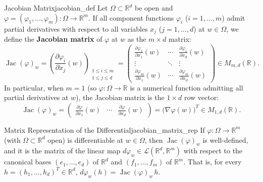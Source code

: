 \documentclass[11pt, a4paper]{article}
\newcommand{\R}{\mathbb{R}}
\begin{document}
\begin{definition}{Jacobian Matrix}{jacobian_def}
Let $\Omega \subset \R^d$ be open and $\varphi = (\varphi_1, \dots, \varphi_m): \Omega \to \R^m$. If all component functions $\varphi_i$ ($i = 1, \dots, m$) admit partial derivatives with respect to all variables $x_j$ ($j = 1, \dots, d$) at $w \in \Omega$, we define the \textbf{Jacobian matrix} of $\varphi$ at $w$ as the $m \times d$ matrix:
\[
\operatorname{Jac}(\varphi)_w = \left(\frac{\partial \varphi_i}{\partial x_j}(w)\right)_{\substack{1 \le i \le m \\ 1 \le j \le d}} = \begin{pmatrix}
\frac{\partial \varphi_1}{\partial x_1}(w) & \cdots & \frac{\partial \varphi_1}{\partial x_d}(w) \\
\vdots & \ddots & \vdots \\
\frac{\partial \varphi_m}{\partial x_1}(w) & \cdots & \frac{\partial \varphi_m}{\partial x_d}(w)
\end{pmatrix} \in M_{m, d}(\R).
\]
In particular, when $m = 1$ (so $\varphi: \Omega \to \R$ is a numerical function admitting all partial derivatives at $w$), the Jacobian matrix is the $1 \times d$ row vector:
\[
\operatorname{Jac}(\varphi)_w = \begin{pmatrix}
\frac{\partial \varphi}{\partial x_1}(w) & \cdots & \frac{\partial \varphi}{\partial x_d}(w)
\end{pmatrix} = \big(\nabla \varphi(w)\big)^T \in M_{1, d}(\R).
\]
\end{definition}

\begin{proposition}{Matrix Representation of the Differential}{jacobian_matrix_rep}
If $\varphi: \Omega \to \R^m$ (with $\Omega \subset \R^d$ open) is differentiable at $w \in \Omega$, then $\operatorname{Jac}(\varphi)_w$ is well-defined, and it is the matrix of the linear map $d\varphi_w \in \mathcal{L}(\R^d, \R^m)$ with respect to the canonical bases $(e_1, \dots, e_d)$ of $\R^d$ and $(f_1, \dots, f_m)$ of $\R^m$. That is, for every $h = (h_1, \dots, h_d)^T \in \R^d$, $d\varphi_w(h) = \operatorname{Jac}(\varphi)_w \, h$.
\end{proposition}
\end{document}
